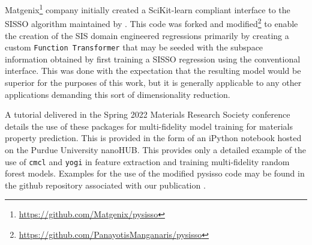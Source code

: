 Matgenix\footnote{\url{https://github.com/Matgenix/pysisso}} company initially created a SciKit-learn compliant interface to the SISSO algorithm maintained by \textcite{ouyang-2018-sisso}.
This code was forked and modified\footnote{\url{https://github.com/PanayotisManganaris/pysisso}} to enable the creation of the SIS domain engineered regressions primarily by creating a custom \texttt{Function Transformer} that may be seeded with the subspace information obtained by first training a SISSO regression using the conventional interface.
This was done with the expectation that the resulting model would be superior for the purposes of this work, but it is generally applicable to any other applications demanding this sort of dimensionality reduction.

A tutorial delivered in the Spring 2022 Materials Research Society conference details the use of these packages for multi-fidelity model training for materials property prediction.
This is provided in the form of an iPython notebook hosted on the Purdue University nanoHUB.
This provides only a detailed example of the use of \texttt{cmcl} and \texttt{yogi} in feature extraction and training multi-fidelity random forest models.
Examples for the use of the modified pysisso code may be found in the github repository associated with our publication .
